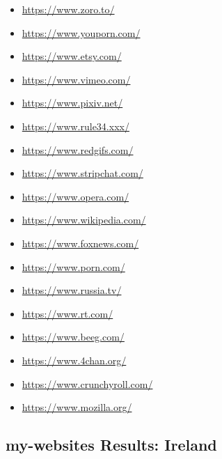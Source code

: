 \begin{multicols}{2}
\begin{itemize}
    \item \url{https://www.zoro.to/}
    \item \url{https://www.youporn.com/}
    \item \url{https://www.etsy.com/}
    \item \url{https://www.vimeo.com/}
    \item \url{https://www.pixiv.net/}
    \item \url{https://www.rule34.xxx/}
    \item \url{https://www.redgifs.com/}
    \item \url{https://www.stripchat.com/}
    \item \url{https://www.opera.com/}
    \item \url{https://www.wikipedia.com/}
    \item \url{https://www.foxnews.com/}
    \item \url{https://www.porn.com/}
    \item \url{https://www.russia.tv/}
    \item \url{https://www.rt.com/}
    \item \url{https://www.beeg.com/}
    \item \url{https://www.4chan.org/}
    \item \url{https://www.crunchyroll.com/}
    \item \url{https://www.mozilla.org/}
\end{itemize}
\end{multicols}

\subsection{my-websites Results: Ireland}

